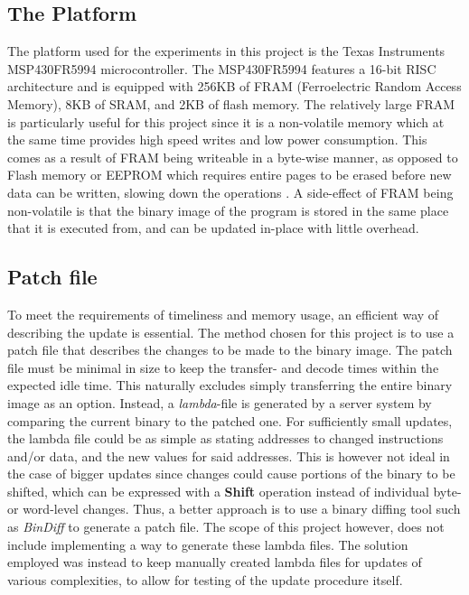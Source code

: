 
\subsection{The Platform}\label{sec:platform}
The platform used for the experiments in this project is the Texas Instruments MSP430FR5994 microcontroller. The MSP430FR5994 features a 16-bit RISC architecture and is equipped with 256KB of FRAM (Ferroelectric Random Access Memory), 8KB of SRAM, and 2KB of flash memory. The relatively large FRAM is particularly useful for this project since it is a non-volatile memory which at the same time provides high speed writes and low power consumption. This comes as a result of FRAM being writeable in a byte-wise manner, as opposed to Flash memory or EEPROM which requires entire pages to be erased before new data can be written, slowing down the operations \cite{framReport}. A side-effect of FRAM being non-volatile is that the binary image of the program is stored in the same place that it is executed from, and can be updated in-place with little overhead. 

\subsection{Patch file}\label{sec:patchfile}
To meet the requirements of timeliness and memory usage, an efficient way of describing the update is essential. The method chosen for this project is to use a patch file that describes the changes to be made to the binary image.
The patch file must be minimal in size to keep the transfer- and decode times within the expected idle time. This naturally excludes simply transferring the entire binary image as an option. Instead, a \textit{lambda}-file is generated by a server system by comparing the current binary to the patched one. For sufficiently small updates, the lambda file could be as simple as stating addresses to changed instructions and/or data, and the new values for said addresses. This is however not ideal in the case of bigger updates since changes could cause portions of the binary to be shifted, which can be expressed with a \textbf{Shift} operation instead of individual byte- or word-level changes. Thus, a better approach is to use a binary diffing tool such as \textit{BinDiff} to generate a patch file. The scope of this project however, does not include implementing a way to generate these lambda files. The solution employed was instead to keep manually created lambda files for updates of various complexities, to allow for testing of the update procedure itself. 

